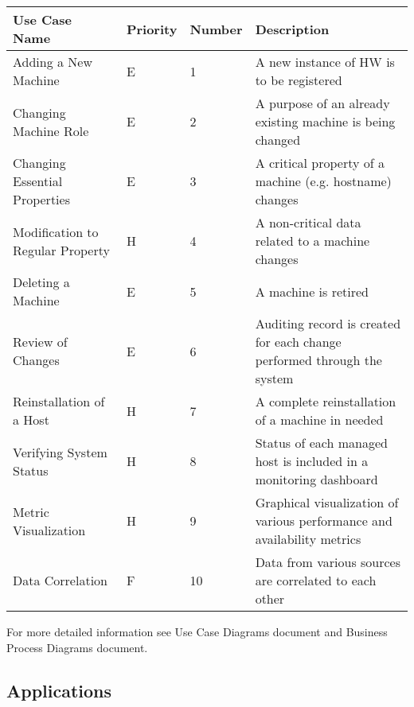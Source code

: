 \documentclass[12pt]{article}
\begin{document}
\begin{center}
	\begin{tabular}{| p{4cm} | p{1.5cm} | p{1.5cm} | p{7cm} |}
		\hline
		\textbf{Use Case Name} & \textbf{Priority} & \textbf{Number} & \textbf{Description}\\
        \hline
        Adding a New Machine & E & 1 & A new instance of HW is to be registered\\
        \hline
        Changing Machine Role & E & 2 & A purpose of an already existing machine is being changed\\
        \hline
        Changing Essential Properties & E & 3 & A critical property of a machine (e.g. hostname) changes\\
        \hline
        Modification to Regular Property & H & 4 & A non-critical data related to a machine changes\\
        \hline
        Deleting a Machine & E & 5 & A machine is retired\\
        \hline
        Review of Changes & E & 6 & Auditing record is created for each change performed through the system\\
        \hline
        Reinstallation of a Host & H & 7 & A complete reinstallation of a machine in needed\\
        \hline
        Verifying System Status & H & 8 & Status of each managed host is included in a monitoring dashboard\\
        \hline
        Metric Visualization & H & 9 & Graphical visualization of various performance and availability metrics\\
		\hline
        Data Correlation & F & 10 & Data from various sources are correlated to each other\\
        \hline
	\end{tabular}
	\label{tab:UseCases}
\end{center}

For more detailed information see Use Case Diagrams document and Business Process Diagrams document.


\subsection{Applications}
\end{document}

